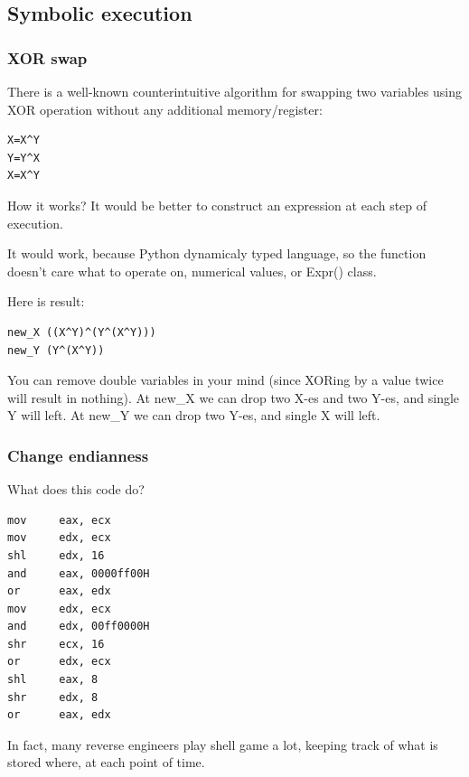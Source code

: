 \subsection{Symbolic execution}
\label{symbolic_exec}

\subsubsection{XOR swap}

There is a well-known counterintuitive algorithm for swapping two variables using XOR operation without any additional
memory/register:

\begin{lstlisting}
X=X^Y
Y=Y^X
X=X^Y
\end{lstlisting}

How it works?
It would be better to construct an expression at each step of execution.



It would work, because Python dynamicaly typed language, so the function doesn't care what to operate on,
numerical values, or Expr() class.

Here is result:

\begin{lstlisting}
new_X ((X^Y)^(Y^(X^Y)))
new_Y (Y^(X^Y))
\end{lstlisting}

You can remove double variables in your mind (since XORing by a value twice will result in nothing).
At new\_X we can drop two X-es and two Y-es, and single Y will left.
At new\_Y we can drop two Y-es, and single X will left.

\subsubsection{Change endianness}

What does this code do?

\begin{lstlisting}
mov     eax, ecx
mov     edx, ecx
shl     edx, 16
and     eax, 0000ff00H
or      eax, edx
mov     edx, ecx
and     edx, 00ff0000H
shr     ecx, 16
or      edx, ecx
shl     eax, 8
shr     edx, 8
or      eax, edx
\end{lstlisting}

In fact, many reverse engineers play shell game a lot, keeping track of what is stored where, at each point of time.

